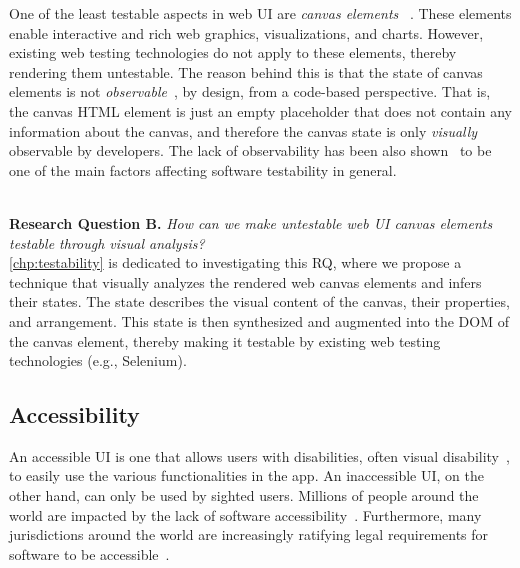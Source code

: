 One of the least testable aspects in web UI are \emph{canvas elements}
~\cite{w3c_canvas_standard}. These elements enable interactive and rich 
web graphics, visualizations, and charts. However, existing web testing technologies do not apply to these elements, 
thereby rendering them untestable. The reason behind this is that the state of 
canvas elements is not \emph{observable}~\cite{w3c_canvas_standard}, by design, 
from a code-based perspective. 
That is, the canvas HTML element is just an empty placeholder that does 
not contain any information about the canvas, and therefore the canvas state 
is only \emph{visually} observable by developers. 
The lack of observability has been also shown~\cite{garousi2019survey} to be 
one of the main factors affecting software testability in general. 

\ \\ 
\textbf{Research Question B.}
\textit{How can we make untestable web UI canvas elements testable through visual 
	analysis?
}
\\ 
\autoref{chp:testability} is dedicated to investigating this RQ, where we propose 
a technique that visually analyzes the rendered web canvas elements and infers their 
states. The state describes the visual content of the canvas, their properties, 
and arrangement. This state is then synthesized and augmented into the DOM of the canvas element, 
thereby making it testable by existing web testing technologies (e.g., 
Selenium). 
 

\subsection{Accessibility} \label{subsec:accessibility}
An accessible UI is one that allows users with disabilities, often visual disability~\cite{2019users_survey},   
to easily use the various functionalities in the app. An inaccessible UI, on the other 
hand, can only be used by sighted users. 
Millions of people around the world are impacted by the lack of software 
accessibility~\cite{stats:accessibility_population:US}.
Furthermore, many jurisdictions around the world are increasingly ratifying legal 
requirements for software to be accessible~\cite{law:ada, law:eu_accessibility}.   

